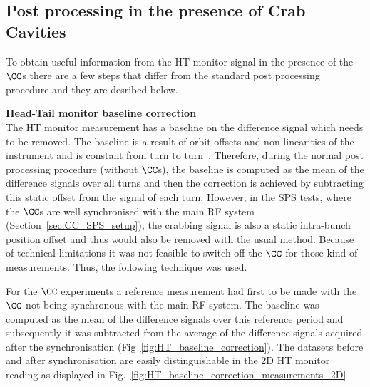 \subsection{Post processing in the presence of Crab Cavities}\label{subsec:HT_post_process_CC}
To obtain useful information from the HT monitor signal in the presence of the $\CC$s there are a few steps that differ from the standard post processing procedure and they are desribed below.

\normalsize{\textbf{Head-Tail monitor baseline correction}}\\
The HT monitor measurement has a baseline on the difference signal which needs to be removed. The baseline is a result of orbit offsets and non-linearities of the instrument and is constant from turn to turn~\cite{Levens:2313358}. Therefore, during the normal post processing procedure (without $\CC$s), the baseline is computed as the mean of the difference signals over all turns and then the correction is achieved by subtracting this static offset from the signal of each turn. However, in the SPS tests, where the $\CC$s are well synchronised with the main RF system (Section~\ref{sec:CC_SPS_setup}), the crabbing signal is also a static intra-bunch position offset and thus would also be removed with the usual method. Because of technical limitations it was not feasible to switch off the $\CC$ for those kind of measurements. Thus, the following technique was used. 

For the $\CC$ experiments a reference measurement had first to be made with the $\CC$ not being synchronous with the main RF system. The baseline was computed as the mean of the difference signals over this reference period and subsequently it was subtracted from the average of the difference signals acquired after the synchronisation (Fig~\ref{fig:HT_baseline_correction}). The datasets before and after synchronisation are easily distinguishable in the 2D HT monitor reading as displayed in Fig.~\ref{fig:HT_baseline_correction_measurements_2D}


